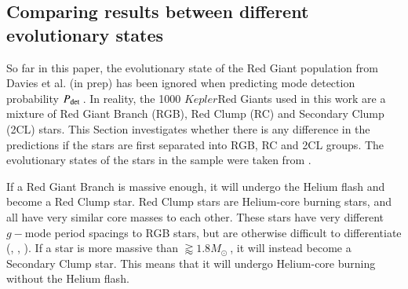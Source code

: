 \documentclass[a4paper,fleqn,usenatbib,useAMS]{mnras}
\newcommand{\kep}{\ensuremath{Kepler}\:}
\newcommand{\pdet}{\ensuremath{P_{\rm det}\:}}
\newcommand{\msol}{\ensuremath{M_{\odot}\:}}
\begin{document}
\subsection{Comparing results between different evolutionary states}
\label{sect: evo states}

So far in this paper, the evolutionary state of the Red Giant population from Davies et al. (in prep) has been ignored when predicting mode detection probability \pdet. In reality, the 1000 \kep Red Giants used in this work are a mixture of Red Giant Branch (RGB), Red Clump (RC) and Secondary Clump (2CL) stars. This Section investigates whether there is any difference in the predictions if the stars are first separated into RGB, RC and 2CL groups. The evolutionary states of the stars in the sample were taken from \citet{elsworth_new_2017}. 

If a Red Giant Branch is massive enough, it will undergo the Helium flash and become a Red Clump star. Red Clump stars are Helium-core burning stars, and all have very similar core masses to each other. These stars have very different $g-$mode period spacings to RGB stars, but are otherwise difficult to differentiate (\citet{chaplin_asteroseismology_2013}, \citet{bedding_solar-like_2011}, \citet{beck_kepler_2011}). If a star is more massive than $\gtrapprox1.8\msol$, it will instead become a Secondary Clump star. This means that it will undergo Helium-core burning without the Helium flash.
\end{document}
